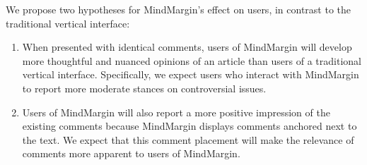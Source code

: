 



We propose two hypotheses for MindMargin's effect on users, in contrast to the traditional vertical interface:
\begin{enumerate}
\item When presented with identical comments, users of MindMargin will develop more thoughtful and nuanced opinions of an article than users of a traditional vertical interface. %
Specifically, we expect users who interact with MindMargin to report more moderate stances on controversial issues.
\item Users of MindMargin will also report a more positive impression of the existing comments because MindMargin displays comments anchored next to the text. We expect that this comment placement will make the relevance of comments more apparent to users of MindMargin.
\end{enumerate}


